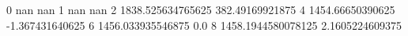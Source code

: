0 nan nan
1 nan nan
2 1838.525634765625 382.49169921875
4 1454.66650390625 -1.367431640625
6 1456.033935546875 0.0
8 1458.1944580078125 2.1605224609375
